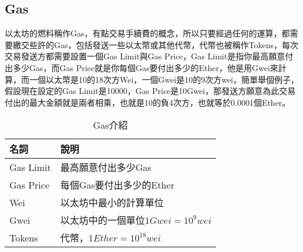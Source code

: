 \documentclass[12pt, a4paper]{article}
\begin{document}
\subsection{Gas}
以太坊的燃料稱作Gas，有點交易手續費的概念，所以只要經過任何的運算，都需要繳交些許的Gas，包括發送一些以太幣或其他代幣，代幣也被稱作Tokens，每次交易發送方都需要設置一個Gas Limit與Gas Price，Gas Limit是指你最高願意付出多少Gas，而Gas Price就是你每個Gas要付出多少的Ether，他是用Gwei來計算，而一個以太幣是10的18次方Wei，一個Gwei是10的9次方wei，簡單舉個例子，假設現在設定的Gas Limit是10000，Gas Price是10Gwei，那發送方願意為此交易付出的最大金額就是兩者相乘，也就是10的負4次方，也就等於0.0001個Ether。
\begin{table}[h]
\begin{center}
\caption{Gas介紹}\label{tb:Gas}
\extrarowheight=4pt
\begin{tabular}{ll}
\rowcolor[gray]{.9}
名詞			&	說明\\
\toprule
Gas Limit	&	最高願意付出多少Gas\\
Gas Price	&	每個Gas要付出多少的Ether\\
Wei      	&	以太坊中最小的計算單位\\
Gwei      	&	以太坊中的一個單位$1Gwei=10^9wei$\\
Tokens	    &	代幣，$1Ether=10^{18}wei$\\
\bottomrule
\end{tabular}
\end{center}
\vspace{1cm}
\end{table}
\end{document}
